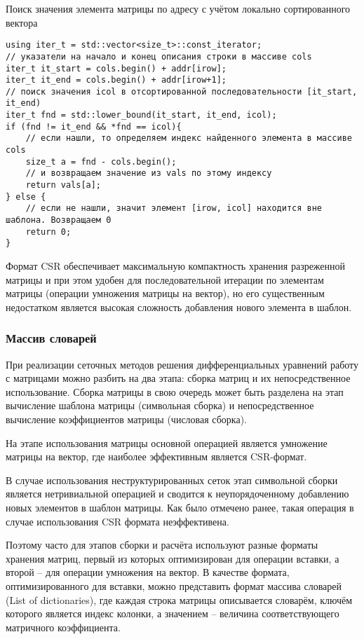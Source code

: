 Поиск значения элемента матрицы по адресу  с учётом локально сортированного вектора 
\begin{verbatim}
using iter_t = std::vector<size_t>::const_iterator;
// указатели на начало и конец описания строки в массиве cols
iter_t it_start = cols.begin() + addr[irow];
iter_t it_end = cols.begin() + addr[irow+1];
// поиск значения icol в отсортированной последовательности [it_start, it_end)
iter_t fnd = std::lower_bound(it_start, it_end, icol);
if (fnd != it_end && *fnd == icol){
	// если нашли, то определяем индекс найденного элемента в массиве cols
	size_t a = fnd - cols.begin();
	// и возвращаем значение из vals по этому индексу
	return vals[a];
} else {
	// если не нашли, значит элемент [irow, icol] находится вне шаблона. Возвращаем 0
	return 0;
}
\end{verbatim}

Формат CSR обеспечивает максимальную компактность хранения
разреженной матрицы и при этом удобен для последовательной итерации по элементам матрицы (операции умножения матрицы на вектор),
но его существенным недостатком является высокая сложность добавления нового элемента в шаблон.

\subsubsection{Массив словарей}
При реализации сеточных методов решения дифференциальных уравнений работу с матрицами
можно разбить на два этапа: сборка матриц и их непосредственное использование.
Сборка матрицы в свою очередь может быть разделена на
этап вычисление шаблона матрицы (символьная сборка) и
непосредственное вычисление коэффициентов матрицы (числовая сборка).

На этапе использования матрицы основной операцией
является умножение матрицы на вектор, где наиболее эффективным является CSR-формат.

В случае использования неструктурированных сеток этап символьной сборки
является нетривиальной операцией и сводится к неупорядоченному добавлению
новых элементов в шаблон матрицы. Как было отмечено ранее, 
такая операция в случае использования CSR формата неэффективена.

Поэтому часто для этапов сборки и расчёта используют
разные форматы хранения матриц, первый из которых оптимизирован для операции вставки, а второй -- для операции умножения на вектор.
В качестве формата, оптимизированного для вставки, можно представить формат массива словарей (List of dictionaries), где каждая строка матрицы
описывается словарём, ключём которого является индекс колонки, а значением -- величина соответствующего матричного коэффициента.

